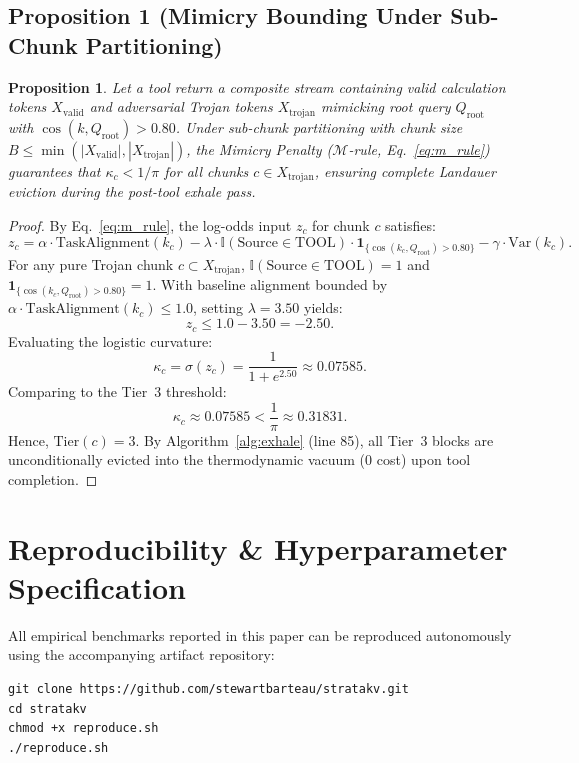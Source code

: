 \documentclass[11pt,letterpaper]{article}
\newtheorem{proposition}{Proposition}
\theoremstyle{definition}
\begin{document}
\subsection{Proposition 1 (Mimicry Bounding Under Sub-Chunk Partitioning)}
\begin{proposition}
Let a tool return a composite stream containing valid calculation tokens $X_{\text{valid}}$ and adversarial Trojan tokens $X_{\text{trojan}}$ mimicking root query $Q_{\text{root}}$ with $\cos(k, Q_{\text{root}}) > 0.80$. Under sub-chunk partitioning with chunk size $B \le \min(|X_{\text{valid}}|, |X_{\text{trojan}}|)$, the Mimicry Penalty ($\mathcal{M}$-rule, Eq.~\ref{eq:m_rule}) guarantees that $\kappa_c < 1/\pi$ for all chunks $c \in X_{\text{trojan}}$, ensuring complete Landauer eviction during the post-tool exhale pass.
\end{proposition}
\begin{proof}
By Eq.~\ref{eq:m_rule}, the log-odds input $z_c$ for chunk $c$ satisfies:
$$z_c = \alpha \cdot \text{TaskAlignment}(k_c) - \lambda \cdot \mathbb{I}(\text{Source} \in \text{TOOL}) \cdot \mathbf{1}_{\{\cos(k_c, Q_{\text{root}}) > 0.80\}} - \gamma \cdot \text{Var}(k_c).$$
For any pure Trojan chunk $c \subset X_{\text{trojan}}$, $\mathbb{I}(\text{Source} \in \text{TOOL}) = 1$ and $\mathbf{1}_{\{\cos(k_c, Q_{\text{root}}) > 0.80\}} = 1$. With baseline alignment bounded by $\alpha \cdot \text{TaskAlignment}(k_c) \le 1.0$, setting $\lambda = 3.50$ yields:
$$z_c \le 1.0 - 3.50 = -2.50.$$
Evaluating the logistic curvature:
$$\kappa_c = \sigma(z_c) = \frac{1}{1 + e^{2.50}} \approx 0.07585.$$
Comparing to the Tier~3 threshold:
$$\kappa_c \approx 0.07585 < \frac{1}{\pi} \approx 0.31831.$$
Hence, $\text{Tier}(c) = 3$. By Algorithm~\ref{alg:exhale} (line 85), all Tier~3 blocks are unconditionally evicted into the thermodynamic vacuum ($0$ cost) upon tool completion.
\end{proof}

\section{Reproducibility \& Hyperparameter Specification}
\label{app:reproduce}

All empirical benchmarks reported in this paper can be reproduced autonomously using the accompanying artifact repository:
\begin{verbatim}
git clone https://github.com/stewartbarteau/stratakv.git
cd stratakv
chmod +x reproduce.sh
./reproduce.sh
\end{verbatim}
\end{document}
